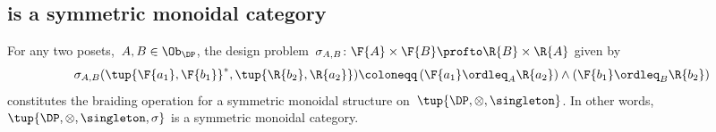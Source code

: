 \subsection{\DP is a symmetric monoidal category}
\begin{lemma}
\label{lemma:symmetricmonoidaldp}
For any two posets,~$A,B \in\Ob_\DP$, the design problem~$\sigma_{A,B}\colon \F{A} \times \F{B} \profto \R{B} \times \R{A}$ given by
\begin{equation}
        \sigma_{A,B}(\tup{\F{a_1},\F{b_1}}^*,\tup{\R{b_2},\R{a_2}})\coloneqq \left(\F{a_1}\ordleq_A \R{a_2}\right)\wedge \left(\F{b_1}\ordleq_B \R{b_2}\right)
\end{equation}
constitutes the braiding operation for a symmetric monoidal structure on~$\tup{\DP,\otimes,\singleton}$. In other words,~$\tup{\DP, \otimes, \singleton, \sigma}$ is a symmetric monoidal category.
\end{lemma}

